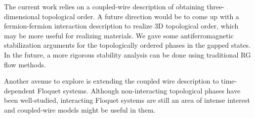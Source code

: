 The current work relies on a coupled-wire description of obtaining three-dimensional topological order. A future direction would be to come up with a fermion-fermion interaction description to realize 3D topological order, which may be more useful for realizing materials. We gave some antiferromagnetic stabilization arguments for the topologically ordered phases in the gapped states. In the future, a more rigorous stability analysis can be done using traditional RG flow methods. 

Another avenue to explore is extending the coupled wire description to time-dependent Floquet systems. Although non-interacting topological phases have been well-studied, interacting Floquet systems are still an area of intense interest and coupled-wire models might be useful in them.  
